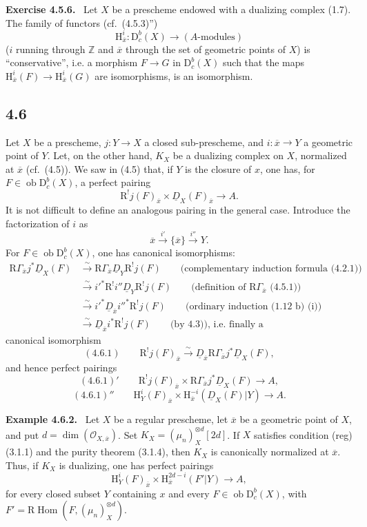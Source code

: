 \documentclass[11pt]{article}
\providecommand{\cO}{\mathcal{O}}
\newenvironment{statement}[1]{\par\medskip\noindent\textbf{#1.}\ }{\par\medskip}
\renewcommand{\H}{\mathrm{H}}
\DeclareMathOperator{\Hom}{Hom}
\newcommand{\R}{\mathrm{R}}
\newcommand{\D}{\mathrm{D}}
\newcommand{\Z}{\mathbb{Z}}
\newcommand{\ob}{\operatorname{ob}}
\newcommand{\ol}[1]{\overline{#1}}
\begin{document}
\begin{statement}{Exercise 4.5.6}
Let $X$ be a prescheme endowed with a dualizing complex (1.7). The family of functors (cf.~(4.5.3)'')
\[
\H_{\ol{x}}^i:\D_c^b(X)\longrightarrow (A\text{-modules})
\]
($i$ running through $\Z$ and $\ol{x}$ through the set of geometric points of $X$) is ``conservative'', i.e. a morphism $F\to G$ in $\D_c^b(X)$ such that the maps $\H_{\ol{x}}^i(F)\to\H_{\ol{x}}^i(G)$ are isomorphisms, is an isomorphism.
\end{statement}

\subsection*{4.6}
Let $X$ be a prescheme, $j:Y\to X$ a closed sub-prescheme, and $i:\ol{x}\to Y$ a geometric point of $Y$. Let, on the other hand, $K_X$ be a dualizing complex on $X$, normalized at $\ol{x}$ (cf.~(4.5)). We saw in (4.5) that, if $Y$ is the closure of $x$, one has, for $F\in\ob\D_c^b(X)$, a perfect pairing
\[
\R^{!}j(F)_{\ol{x}}\times \underline{D}_X(F)_{\ol{x}}\longrightarrow A.
\]
It is not difficult to define an analogous pairing in the general case. Introduce the factorization of $i$ as
\[
\ol{x}\xrightarrow{i'}\{\ol{x}\}\xrightarrow{i''}Y.
\]
For $F\in\ob\D_c^b(X)$, one has canonical isomorphisms:
\[
\begin{aligned}
\R\Gamma_{\ol{x}}j^*\underline{D}_X(F)&\xrightarrow{\sim}\R\Gamma_{\ol{x}}\underline{D}_Y\R^{!}j(F)\qquad\text{(complementary induction formula (4.2.1))}\\
&\xrightarrow{\sim}i'^*\R^{!}i''\underline{D}_Y\R^{!}j(F)\qquad\text{(definition of $\R\Gamma_{\ol{x}}$ (4.5.1))}\\
&\xrightarrow{\sim}i'^*\underline{D}_{\ol{x}}i''^*\R^{!}j(F)\qquad\text{(ordinary induction (1.12 b) (i))}\\
&\xrightarrow{\sim}\underline{D}_{\ol{x}}i^*\R^{!}j(F)\qquad\text{(by 4.3)), i.e. finally a}
\end{aligned}
\]
canonical isomorphism
\[
(4.6.1)\qquad \R^{!}j(F)_{\ol{x}}\xrightarrow{\sim}\underline{D}_{\ol{x}}\R\Gamma_{\ol{x}}j^*\underline{D}_X(F),
\]
and hence perfect pairings
\[
(4.6.1)'\qquad \R^{!}j(F)_{\ol{x}}\times \R\Gamma_{\ol{x}}j^*\underline{D}_X(F)\longrightarrow A,
\]
\[
(4.6.1)''\qquad \H_Y^i(F)_{\ol{x}}\times \H_{\ol{x}}^{-i}(\underline{D}_X(F)|Y)\longrightarrow A.
\]

\begin{statement}{Example 4.6.2}
Let $X$ be a regular prescheme, let $\ol{x}$ be a geometric point of $X$, and put $d=\dim(\cO_{X,\ol{x}})$. Set $K_X=(\mu_n)_X^{\otimes d}[2d]$. If $X$ satisfies condition (reg) (3.1.1) and the purity theorem (3.1.4), then $K_X$ is canonically normalized at $\ol{x}$. Thus, if $K_X$ is dualizing, one has perfect pairings
\[
\H_Y^i(F)_{\ol{x}}\times \H_{\ol{x}}^{2d-i}(F'|Y)\longrightarrow A,
\]
for every closed subset $Y$ containing $x$ and every $F\in\ob\D_c^b(X)$, with $F'=\R\Hom(F,(\mu_n)_X^{\otimes d})$.
\end{statement}
\end{document}
